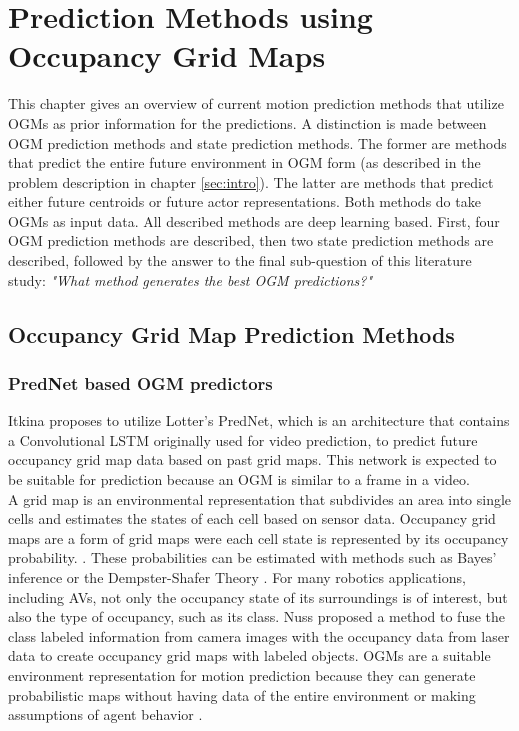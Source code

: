 \section{Prediction Methods using Occupancy Grid Maps} \label{sec:ogm_methods}

This chapter gives an overview of current motion prediction methods that utilize \glspl{OGM} as prior information for the predictions. A distinction is made between \gls{OGM} prediction methods and state prediction methods. The former are methods that predict the entire future environment in \gls{OGM} form (as described in the problem description in chapter \ref{sec:intro}). The latter are methods that predict either future centroids or future actor representations. Both methods do take \glspl{OGM} as input data. All described methods are deep learning based. First, four \gls{OGM} prediction methods are described, then two state prediction methods are described, followed by the answer to the final sub-question of this literature study: \textit{"What method generates the best \gls{OGM} predictions?"}

\subsection{Occupancy Grid Map Prediction Methods} 

\subsubsection{PredNet based OGM predictors}

Itkina \cite{itkina2019dynamic} proposes to utilize Lotter's \cite{lotter2016deep} PredNet, which is an architecture that contains a Convolutional LSTM originally used for video prediction, to predict future occupancy grid map data based on past grid maps. This network is expected to be suitable for  prediction because an \gls{OGM} is similar to a frame in a video. \\


A grid map is an environmental representation that subdivides an area into single cells and estimates the states of each cell based on sensor data. Occupancy grid maps are a form of grid maps were each cell state is represented by its occupancy probability. \cite{nuss2014fusion}. These probabilities can be estimated with methods such as Bayes' inference or the Dempster-Shafer Theory \cite{dempster1968generalization}. For many robotics applications, including AVs, not only the occupancy state of its surroundings is of interest, but also the type of occupancy, such as its class. Nuss \cite{nuss2014fusion} proposed a method to fuse the class labeled information from camera images with the occupancy data from laser data to create occupancy grid maps with labeled objects.    
OGMs are a suitable environment representation for motion prediction because they can generate probabilistic maps without having data of the entire environment or making assumptions of agent behavior \cite{itkina2019dynamic}. \\

